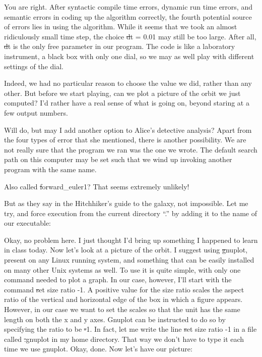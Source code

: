 \alice
You are right.  After syntactic compile time errors, dynamic run time
errors, and semantic errors in coding up the algorithm correctly, the
fourth potential source of errors lies in using the algorithm.  While
it seems that we took an almost ridiculously small time step, the
choice {\st dt = 0.01} may still be too large.  After all, {\st dt} is
the only free parameter in our program.  The code is like a laboratory
instrument, a black box with only one dial, so we may as well play
with different settings of the dial.

\bob
Indeed, we had no particular reason to choose the value we did, rather
than any other.  But before we start playing, can we plot a picture of
the orbit we just computed?  I'd rather have a real sense of what is
going on, beyond staring at a few output numbers.

\carol
Will do, but may I add another option to Alice's detective analysis?
Apart from the four types of error that she mentioned, there is another
possibility.  We are not really sure that the program we ran was the
one we wrote.  The default search path on this computer may be set such
that we wind up invoking another program with the same name.

\bob
Also called {\st forward\_euler1}?  That seems extremely unlikely!

\carol
But as they say in the Hitchhiker's guide to the galaxy, not impossible.
Let me try, and force execution from the current directory ``.'' by
adding it to the name of our executable:

\cba


\abc

\carol
Okay, no problem here.  I just thought I'd bring up something I
happened to learn in class today.  Now let's look at a picture of the
orbit.  I suggest using {\st gnuplot}, present on any Linux running
system, and something that can be easily installed on many other Unix
systems as well.  To use it is quite simple, with only one command
needed to plot a graph.  In our case, however, I'll start with the
command {\st set size ratio -1}.  A positive value for the size ratio
scales the aspect ratio of the vertical and horizontal edge of the box
in which a figure appears.  However, in our case we want to set the
scales so that the unit has the same length on both the x and y axes.
Gnuplot can be instructed to do so by specifying the ratio to be {\st -1}.
In fact, let me write the line {\st set size ratio -1} in a file called
{\st .gnuplot} in my home directory.  That way we don't have to type it
each time we use gnuplot.  Okay, done.  Now let's have our picture:

